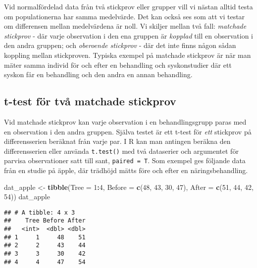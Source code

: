 \documentclass[
]{book}
\newenvironment{Shaded}{\begin{snugshade}}{\end{snugshade}}
\newcommand{\AttributeTok}[1]{\textcolor[rgb]{0.13,0.29,0.53}{#1}}
\newcommand{\DecValTok}[1]{\textcolor[rgb]{0.00,0.00,0.81}{#1}}
\newcommand{\FunctionTok}[1]{\textcolor[rgb]{0.13,0.29,0.53}{\textbf{#1}}}
\newcommand{\NormalTok}[1]{#1}
\newcommand{\OtherTok}[1]{\textcolor[rgb]{0.56,0.35,0.01}{#1}}
\newcommand{\SpecialCharTok}[1]{\textcolor[rgb]{0.81,0.36,0.00}{\textbf{#1}}}
\theoremstyle{definition}
\theoremstyle{definition}
\theoremstyle{definition}
\theoremstyle{definition}
\theoremstyle{remark}
\begin{document}
Vid normalfördelad data från två stickprov eller grupper vill vi nästan alltid testa om populationerna har samma medelvärde. Det kan också ses som att vi testar om differensen mellan medelvärdena är noll. Vi skiljer mellan två fall: \emph{matchade stickprov} - där varje observation i den ena gruppen är \emph{kopplad} till en observation i den andra gruppen; och \emph{oberoende stickprov} - där det inte finns någon sådan koppling mellan stickproven. Typiska exempel på matchade stickprov är när man mäter samma individ för och efter en behandling och syskonstudier där ett syskon får en behandling och den andra en annan behandling.

\hypertarget{t-test-fuxf6r-tvuxe5-matchade-stickprov}{%
\subsection{t-test för två matchade stickprov}\label{t-test-fuxf6r-tvuxe5-matchade-stickprov}}

Vid matchade stickprov kan varje observation i en behandlingsgrupp paras med en observation i den andra gruppen. Själva testet är ett t-test för \emph{ett} stickprov på differensserien beräknat från varje par. I R kan man antingen beräkna den differensserien eller använda \texttt{t.test()} med två dataserier och argumentet för parvisa observationer satt till sant, \texttt{paired\ =\ T}.
Som exempel ges följande data från en studie på äpple, där trädhöjd mätts före och efter en näringsbehandling.

\begin{Shaded}
\begin{Highlighting}[]
\NormalTok{dat\_apple }\OtherTok{\textless{}{-}} \FunctionTok{tibble}\NormalTok{(}\AttributeTok{Tree =} \DecValTok{1}\SpecialCharTok{:}\DecValTok{4}\NormalTok{, }
              \AttributeTok{Before =} \FunctionTok{c}\NormalTok{(}\DecValTok{48}\NormalTok{, }\DecValTok{43}\NormalTok{, }\DecValTok{30}\NormalTok{, }\DecValTok{47}\NormalTok{), }
              \AttributeTok{After =} \FunctionTok{c}\NormalTok{(}\DecValTok{51}\NormalTok{, }\DecValTok{44}\NormalTok{, }\DecValTok{42}\NormalTok{, }\DecValTok{54}\NormalTok{))}
\NormalTok{dat\_apple}
\end{Highlighting}
\end{Shaded}

\begin{verbatim}
## # A tibble: 4 x 3
##    Tree Before After
##   <int>  <dbl> <dbl>
## 1     1     48    51
## 2     2     43    44
## 3     3     30    42
## 4     4     47    54
\end{verbatim}
\end{document}
